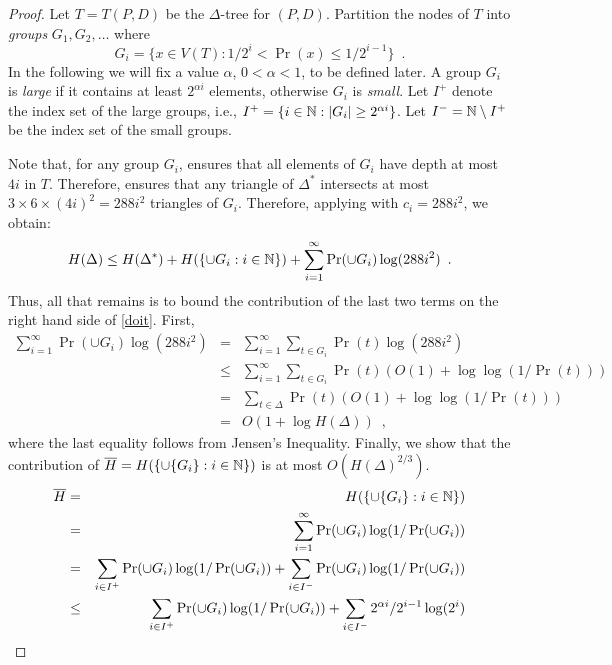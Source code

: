 \documentclass[lotsofwhite]{patmorin}
\begin{document}
\begin{proof}
Let $T=T(P,D)$ be the $\Delta$-tree for $(P,D)$.
Partition the nodes of $T$ into
\emph{groups} $G_1,G_2,\ldots$ where
\[
	G_i = \{x\in V(T) : 1/2^{i} < \Pr(x) \le 1/2^{i-1} \} \enspace .
\]
In the following we will fix a value $\alpha$, $0 < \alpha < 1$, to be
defined later.  A group $G_i$ is \emph{large} if it contains at least
$2^{\alpha i}$ elements, otherwise $G_i$ is \emph{small}.  Let $I^+$
denote the index set of the large groups, i.e., $I^{+}=\{i\in\mathbb{N} :
|G_i| \ge 2^{\alpha i}\}$.  Let $I^{-}= \mathbb{N}\setminus I^+$ be the index
set of the small groups.

Note that, for any group $G_i$,  ensures that all
elements of $G_i$ have depth at most $4i$ in $T$.  Therefore, 
 ensures that any triangle of
$\Delta^*$ intersects at most $3\times 6\times (4i)^2=288i^2$ 
triangles of $G_{i}$.  Therefore,
applying  with $c_{i}=288i^2$, we obtain:
\begin{equation} 
 H(\Delta) \le 
   H(\Delta^*) + H(\{{\cup G_{i}} : i\in\N\}) 
   + \sum_{i=1}^{\infty}\Pr(\cup G_{i})\log(288i^2)  \enspace .
   \eqlabel{doit}
\end{equation}
Thus, all that remains is to bound the contribution of the last two
terms on the right hand side of \eqref{doit}.  First,
\begin{eqnarray*}
   \sum_{i=1}^{\infty}\Pr(\cup G_{i})\log(288i^2)
   &   =  & \sum_{i=1}^\infty\sum_{t\in G_i}\Pr(t)\log(288i^2) \\
   &  \le  & \sum_{i=1}^\infty\sum_{t\in G_i}\Pr(t)(O(1)+\log\log(1/\Pr(t))) \\
    &  =  & \sum_{t\in\Delta} \Pr(t) (O(1)+\log\log(1/\Pr(t))) \\
    &  =  & O(1+\log H(\Delta)) \enspace ,
\end{eqnarray*}
where the last equality follows from Jensen's Inequality.
Finally, we show that the contribution of $\overline
H=H(\{\cup\{G_{i}\} : i\in\mathbb{N}\})$ is at most
$O(H(\Delta)^{2/3})$. 
\begin{eqnarray*}
\overline H 
 &  =  & H(\{\cup\{G_{i}\} : i\in\N\}) \\
 &  =  & \sum_{i=1}^\infty\Pr(\cup G_{i})\log(1/\Pr(\cup G_{i})) \\
 &  =  & \sum_{i\in I^+}\Pr(\cup G_{i})\log(1/\Pr(\cup G_{i})) 
         + \sum_{i\in I^-}\Pr(\cup G_{i})\log(1/\Pr(\cup G_{i})) \\
 & \le & \sum_{i\in I^+}\Pr(\cup G_{i})\log(1/\Pr(\cup G_{i})) 
         + \sum_{i\in I^-}2^{\alpha i}/2^{i-1}\log(2^{i}) \\

\end{eqnarray*}
\end{proof}
\end{document}
